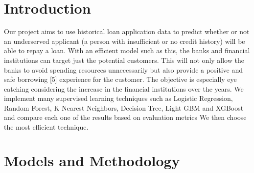 \documentclass[fleqn,10pt]{SelfArx} %
\begin{document}
\flushbottom %

\maketitle %

\tableofcontents %

\thispagestyle{empty} %


\section*{Introduction} %


 Our project aims to use historical loan application data to predict whether or not an underserved applicant (a person with insufficient or no credit history) will be able to repay a loan. With an efficient model such as this, the banks and financial institutions can target just the potential customers. This will not only allow the banks to avoid spending resources unnecessarily but also provide a positive and safe borrowing [5] experience for the customer. The objective is especially eye catching considering the increase in the financial institutions over the years. We implement many supervised learning techniques such as Logistic Regression, Random Forest, K Nearest Neighbors, Decision Tree, Light GBM and XGBoost and compare each one of the results based on evaluation metrics We then choose the most efficient technique. 
 
\pagebreak


\section{Models and Methodology}
\end{document}
